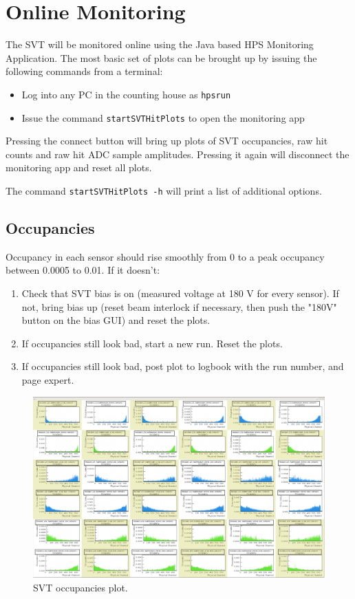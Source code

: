 
\section {Online Monitoring}

The SVT will be monitored online using the Java based HPS Monitoring Application.
The most basic set of plots can be brought up by issuing the following commands 
from a terminal:  

\begin {itemize}
    \item Log into any PC in the counting house as \texttt{hpsrun}
    \item Issue the command \texttt{startSVTHitPlots} to open the monitoring app
\end {itemize}
Pressing the connect button will bring up plots of SVT occupancies, raw hit counts
and raw hit ADC sample amplitudes. Pressing it again will disconnect the monitoring app and reset all plots.

The command \texttt{startSVTHitPlots -h} will print a list of additional options.

\subsection {Occupancies}

Occupancy in each sensor should rise smoothly from 0 to a peak occupancy between 0.0005 to 0.01. If it doesn't:
\begin{enumerate}
\item Check that SVT bias is on (measured voltage at 180 V for every sensor). If not, bring bias up (reset beam interlock if necessary, then push the "180V" button on the bias GUI) and reset the plots.
\item If occupancies still look bad, start a new run. Reset the plots.
\item If occupancies still look bad, post plot to logbook with the run number, and page expert.
\end{enumerate}

\begin{figure}[ht!]
    \centering
    \includegraphics[width=\textwidth]{figures/occupancy_good}
    \caption{SVT occupancies plot.}
    \label{fig:occupancies}
\end{figure}

